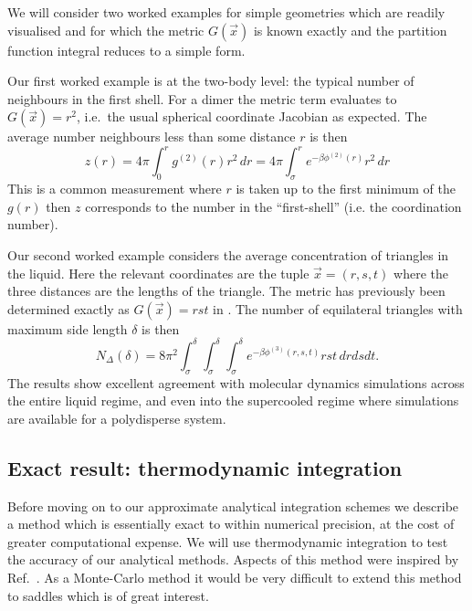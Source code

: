 \documentclass[11pt,twoside]{report}
\begin{document}
We will consider two worked examples for simple geometries which are readily visualised and for which the metric $G(\vec{x})$ is known exactly and the partition function integral reduces to a simple form.

Our first worked example is at the two-body level: the typical number of neighbours in the first shell.
For a dimer the metric term evaluates to $G(\vec{x}) = r^2$, i.e.\ the usual spherical coordinate Jacobian as expected.
The average number neighbours less than some distance $r$ is then
\begin{equation}
  z(r)
  = 4\pi \int_0^r g^{(2)}(r) r^2 \, dr
  = 4\pi \int_\sigma^r e^{-\beta \phi^{(2)}(r)} r^2 \, dr
\end{equation}
This is a common measurement where $r$ is taken up to the first minimum of the $g(r)$ then $z$ corresponds to the number in the ``first-shell'' (i.e. the coordination number).

Our second worked example considers the average concentration of triangles in the liquid.
Here the relevant coordinates are the tuple $\vec{x} = (r,s,t)$ where the three distances are the lengths of the triangle.
The metric has previously been determined exactly as $G(\vec{x}) = rst$ in \cite{?}.
The number of equilateral triangles with maximum side length $\delta$ is then
\begin{equation}
  N_\Delta(\delta)
  =
  8\pi^2 \int_\sigma^\delta\int_\sigma^\delta\int_\sigma^\delta
  e^{-\beta\phi^{(3)}(r,s,t)} rst \, dr ds dt.
\end{equation}
The results show excellent agreement with molecular dynamics simulations across the entire liquid regime, and even into the supercooled regime where simulations are available for a polydisperse system.

\subsection{Exact result: thermodynamic integration}


Before moving on to our approximate analytical integration schemes we describe a method which is essentially exact to within numerical precision, at the cost of greater computational expense.
We will use thermodynamic integration to test the accuracy of our analytical methods.
Aspects of this method were inspired by Ref.\ \cite{SchillingJCP2009}.
As a Monte-Carlo method it would be very difficult to extend this method to saddles which is of great interest.
\end{document}
